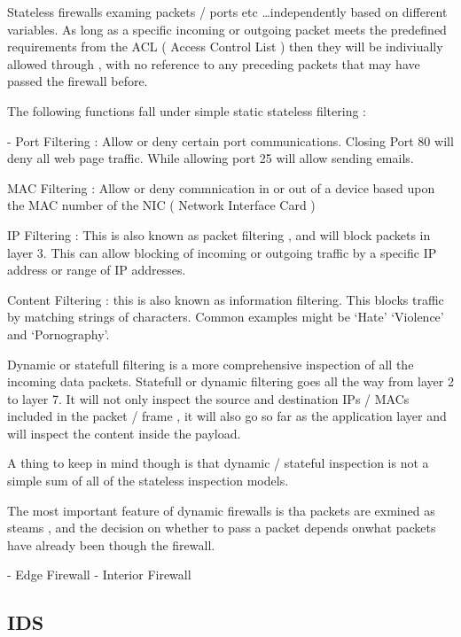 
Stateless firewalls examing packets / ports etc \ldots independently based on
different variables. As long as a specific incoming or outgoing packet meets the
predefined requirements from the ACL ( Access Control List ) then they will be
indiviually allowed through , with no reference to any preceding packets that
may have passed the firewall before.

The following functions fall under simple static stateless filtering :


- Port Filtering : Allow or deny certain port communications. Closing Port 80
will deny all web page traffic. While allowing port 25 will allow sending
emails.

MAC Filtering : Allow or deny commnication in or out of a device based upon the
MAC number of the NIC ( Network Interface Card )

IP Filtering : This is also known as packet filtering , and will block packets
in layer 3. This can allow blocking of incoming or outgoing traffic by a
specific IP address or range of IP addresses.

Content Filtering : this is also known as information filtering. This blocks
traffic by matching strings of characters. Common examples might be `Hate'
`Violence' and `Pornography'.


Dynamic or statefull filtering is a more comprehensive inspection of all the
incoming data packets. Statefull or dynamic filtering goes all the way from
layer 2 to layer 7. It will not only inspect the source and destination IPs /
MACs included in the packet / frame , it will also go so far as the application
layer and will inspect the content inside the payload.

A thing to keep in mind though is that dynamic / stateful inspection is not a
simple sum of all of the stateless inspection models.

The most important feature of dynamic firewalls is tha packets are exmined as
steams , and the decision on whether to pass a packet depends onwhat packets
have already been though the firewall.



- Edge Firewall
- Interior Firewall



\subsectionend

\subsection{IDS}
\label{ssec:ids}

